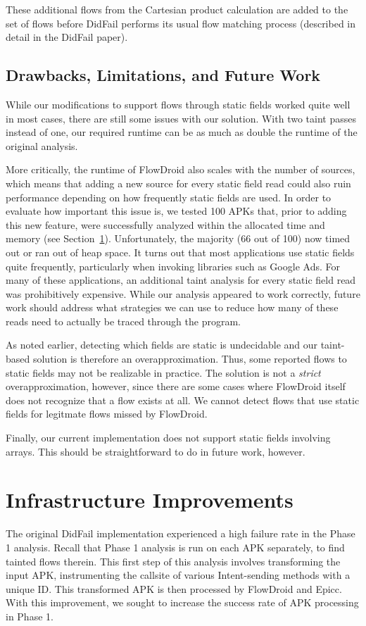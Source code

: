 These additional flows from the Cartesian product calculation are added to the set of flows before DidFail performs its usual flow matching process (described in detail in the DidFail paper).

\subsection{Drawbacks, Limitations, and Future Work}

While our modifications to support flows through static fields worked quite well in most cases, there are still some issues with our solution. With two taint passes instead of one, our required runtime can be as much as double the runtime of the original analysis. 

More critically, the runtime of FlowDroid also scales with the number of sources, which means that adding a new source for every static field read could also ruin performance depending on how frequently static fields are used. In order to evaluate how important this issue is, we tested 100 APKs that, prior to adding this new feature, were successfully analyzed within the allocated time and memory (see Section~\ref{sec:infrastructure}). Unfortunately, the majority (66 out of 100) now timed out or ran out of heap space. It turns out that most applications use static fields quite frequently, particularly when invoking libraries such as Google Ads. For many of these applications, an additional taint analysis for every static field read was prohibitively expensive. While our analysis appeared to work correctly, future work should address what strategies we can use to reduce how many of these reads need to actually be traced through the program.

As noted earlier, detecting which fields are static is undecidable and our taint-based solution is therefore an overapproximation. Thus, some reported flows to static fields may not be realizable in practice. The solution is not a \emph{strict} overapproximation, however, since there are some cases where FlowDroid itself does not recognize that a flow exists at all. We cannot detect flows that use static fields for legitmate flows missed by FlowDroid. 

Finally, our current implementation does not support static fields involving arrays. This should be straightforward to do in future work, however.



\section{Infrastructure Improvements}
\label{sec:infrastructure}
The original DidFail implementation experienced a high failure rate in the Phase 1 analysis.  Recall that Phase 1 analysis is run on each APK separately, to find tainted flows therein.  This first step of this analysis involves transforming the input APK, instrumenting the callsite of various Intent-sending methods with a unique ID.  This transformed APK is then processed by FlowDroid and Epicc.  With this improvement, we sought to increase the success rate of APK processing in Phase 1.

